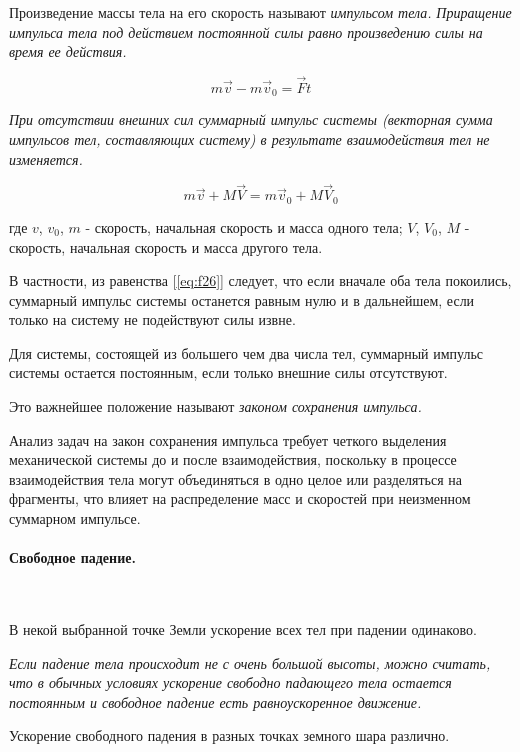 \documentclass[a4paper,12pt]{article}
\begin{document}
		Произведение массы тела на его скорость называют \textit{импульсом тела.}
		\textit{Приращение импульса тела под действием постоянной силы равно
		произведению силы на время ее действия.}

		\begin{equation}
			m\vec{v}-m\vec{v}_0=\vec{F}t
		\end{equation}

		\textit{При отсутствии внешних сил суммарный импульс системы (векторная сумма 
		импульсов тел, составляющих систему) в результате взаимодействия тел не
		изменяется.}

		\begin{equation}
			\label{eq:f26}
			m\vec{v}+M\vec{V}=m\vec{v}_0+M\vec{V}_0
		\end{equation}

		где $v$, $v_0$, $m$  - скорость, начальная скорость и масса одного тела;
		$V$, $V_0$, $M$  - скорость, начальная скорость и масса другого тела.

		В частности, из равенства [\ref{eq:f26}] следует, что если вначале оба тела
		покоились, суммар­ный импульс системы останется равным нулю и в даль­нейшем, 
		если только на систему не подействуют силы извне. 

		Для системы, состоящей из боль­шего чем два числа тел, суммарный импульс 
		системы оста­ется постоянным, если только внешние силы отсутствуют. 
		
		Это важнейшее положение называют \textit{законом сохранения импульса.}
		
		Анализ задач на закон сохранения импульса требует четкого выделения 
		механической системы до и после взаимодействия, поскольку в процессе
		взаимодействия тела могут объединяться в одно целое или разделяться
		на фрагменты, что влияет на распределение масс и скоростей при неизменном
		суммарном импульсе.

		\clearpage{}
		\paragraph{Свободное падение.} \
		
		В некой выбранной точке Земли ускорение всех тел при падении одинаково.

		\textit{Если падение тела происходит не с очень большой высоты, можно считать,
		что в обычных условиях ускорение свободно падающего тела остается
		постоянным и свободное падение есть равноускоренное движение.}

		Ускорение свободного падения в разных точках земного шара различно. 
		
\end{document}
